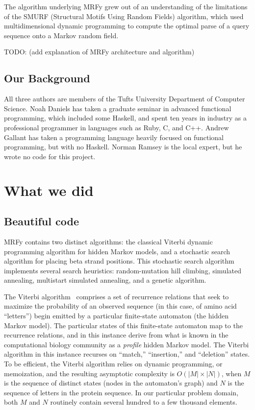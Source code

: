 \documentclass[preprint]{sigplanconf}
\begin{document}
The algorithm underlying MRFy grew out of an understanding of the limitations 
of the SMURF (Structural Motifs Using Random Fields) algorithm, which used 
multidimensional dynamic programming to compute the optimal parse of a query 
sequence onto a Markov random field.


TODO: (add explanation of MRFy architecture and algorithm)

\subsection{Our Background}

All three authors are members of the Tufts University Department of Computer 
Science. Noah Daniels has taken a graduate seminar in advanced functional 
programming, which included some Haskell, and spent ten years in industry as a 
professional programmer in languages such as Ruby, C, and C++. Andrew Gallant 
has taken a programming language heavily focused on functional programming, but 
with no Haskell. Norman Ramsey is the local expert, but he wrote no code for 
this project.


\section{What we did}

\subsection{Beautiful code}
MRFy contains two distinct algorithms: the classical Viterbi dynamic 
programming algorithm for hidden Markov models, and a stochastic search 
algorithm for placing beta strand positions. This stochastic search algorithm 
implements several search heuristics: random-mutation hill climbing, simulated 
annealing, multistart simulated annealing, and a genetic algorithm.


The Viterbi algorithm~\cite{Viterbi:1967} comprises a set of recurrence 
relations that seek to maximize the probability of an observed sequence (in 
this case, of amino acid ``letters'') begin emitted by a particular 
finite-state automaton (the hidden Markov model). The particular states of this 
finite-state automaton map to the recurrence relations, and in this instance 
derive from what is known in the computational biology community as a 
\textit{profile} hidden Markov model. The Viterbi algorithm in this instance 
recurses on ``match,'' ``insertion,'' and ``deletion'' states. To be efficient, 
the Viterbi algorithm relies on dynamic programming, or memoization, and the 
resulting asymptotic complexity is $O(|M|\times|N|)$, when $M$ is the sequence 
of distinct states (nodes in the automaton's graph) and $N$ is the sequence of 
letters in the protein sequence. In our particular problem domain, both $M$ and 
$N$ routinely contain several hundred to a few thousand elements.
\end{document}
